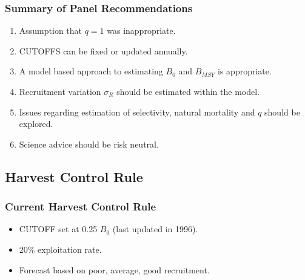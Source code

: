 %
\begin{frame}[t]\frametitle{Summary of Panel Recommendations}
	\begin{enumerate}
		\item<+> Assumption that $q=1$ was inappropriate.
		\item<+> CUTOFFS can be fixed or updated annually.
		\item<+> A model based approach to estimating $B_0$ and $B_{MSY}$ is appropriate.
		\item<+> Recruitment variation $\sigma_R$ should be estimated within the model.
		\item<+> Issues regarding estimation of selectivity, natural mortality and $q$ should be explored.
		\item<+> Science advice should be risk neutral.
	\end{enumerate}
	
	
	
	
\end{frame}


\subsection{Harvest Control Rule} %
\label{sub:harvest_control_rule}
\begin{frame}[t]\frametitle{Current Harvest Control Rule}
	\begin{itemize}
		\item  CUTOFF set at 0.25 $B_0$ (last updated in 1996).
		\item 20\% exploitation rate.
		\item Forecast based on poor, average, good recruitment.
	\end{itemize}
	
\end{frame}



